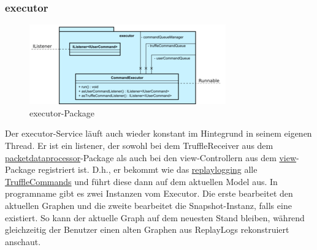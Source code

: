     \subsubsection{executor}
    \label{subsubsec:executor}

    \begin{figure}[H]
      \centering
      \includegraphics[width=\textwidth]{../diagramimages/executor.png}
      \caption{executor-Package}
    \end{figure}

    \medskip
    Der executor-Service läuft auch wieder konstant im Hintegrund in seinem
    eigenen Thread. Er ist ein \gls{listener}, der sowohl bei dem TruffleReceiver aus dem
    \hyperref[subsubsec:packetdataprocessor]{packetdataprocessor}-Package als
    auch bei den view-Controllern aus dem \hyperref[subsec:view]{view}-Package
    registriert ist. D.h., er bekommt wie das \hyperref[subsubsec:replaylogging]{replaylogging}
    alle \hyperref[subsubsec:trufflecommand]{TruffleCommands} und führt diese
    dann auf dem aktuellen Model aus.
    \newline
    \newline
    In \gls{programname} gibt es zwei Instanzen vom Executor. Die erste bearbeitet
    den aktuellen Graphen und die zweite bearbeitet die Snapshot-Instanz, falls
    eine existiert. So kann der aktuelle Graph auf dem neuesten Stand bleiben, während
    gleichzeitig der Benutzer einen alten Graphen aus
    ReplayLogs rekonstruiert anschaut.

